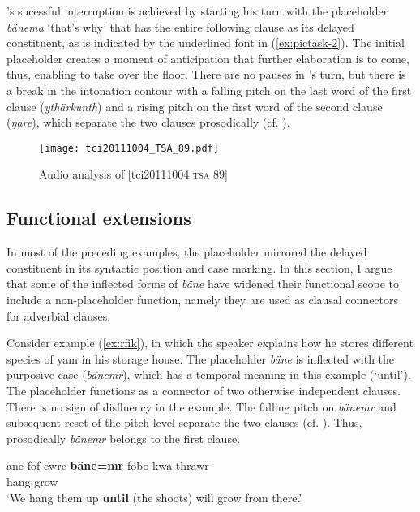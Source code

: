 \documentclass[output=paper,colorlinks,citecolor=brown]{langscibook}
\begin{document}
's sucessful interruption is achieved by starting his turn with the placeholder \textit{bänema} `that's why' that has the entire following clause as its delayed constituent, as is indicated by the underlined font in (\ref{ex:pictask-2}). The initial placeholder creates a moment of anticipation that further elaboration is to come, thus, enabling  to take over the floor. There are no pauses in 's turn, but there is a break in the intonation contour with a falling pitch on the last word of the first clause (\textit{ythärkunth}) and a rising pitch on the first word of the second clause (\textit{ŋare}), which separate the two clauses prosodically (cf. ).

\begin{figure}
    \texttt{[image: tci20111004\_TSA\_89.pdf]}
    \caption{Audio analysis of [tci20111004 \textsc{tsa} 89]}
    \label{fig:doehler:pictask-2b}
\end{figure}

\subsection{Functional extensions}\label{sec:doehler:banefuncext}

In most of the preceding examples, the placeholder mirrored the delayed constituent in its syntactic position and case marking. In this section, I argue that some of the inflected forms of \textit{bäne} have widened their functional scope to include a non-placeholder function, namely they are used as clausal connectors for adverbial clauses.

Consider example (\ref{ex:rfik}), in which the speaker explains how he stores different species of yam in his storage house. The placeholder \textit{bäne} is inflected with the purposive case (\textit{bänemr}), which has a temporal meaning in this example (`until'). The placeholder functions as a connector of two otherwise independent clauses. There is no sign of disfluency in the example. The falling pitch on \textit{bänemr} and subsequent reset of the pitch level separate the two clauses (cf. ). Thus, prosodically \textit{bänemr} belongs to the first clause.

\ea \label{ex:rfik}
    \gll ane fof ewre \textbf{bäne=mr} fobo kwa thrawr\\
      hang    grow\\
    \glt `We hang them up \textbf{until} (the shoots) will grow from there.' 
\z
\end{document}
